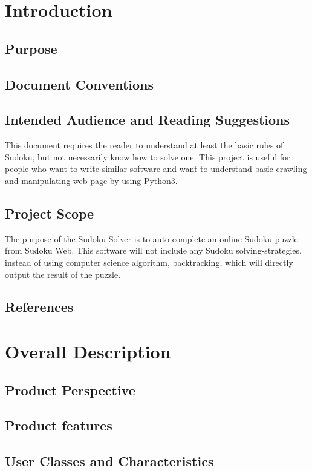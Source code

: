 \documentclass{article}
\title{}
\author{}
\date{}
\begin{document}
\section{Introduction}
	\subsection{Purpose}


	\subsection{Document Conventions}

	\subsection{Intended Audience and Reading Suggestions}
	This document requires the reader to understand at least the basic rules
	of Sudoku, but not necessarily know how to solve one. This project is 
	useful for people who want to write similar software and want to 
	understand basic crawling and manipulating web-page by using Python3. 

	\subsection{Project Scope}
	The purpose of the Sudoku Solver is to auto-complete an online Sudoku 
	puzzle from Sudoku Web. This software will not include any Sudoku 
	solving-strategies, instead of using computer science algorithm, 
	backtracking, which will directly output the result of the puzzle.  

	\subsection{References}

\section{Overall Description}
	\subsection{Product Perspective}
	\subsection{Product features}
	\subsection{User Classes and Characteristics}
\end{document}
